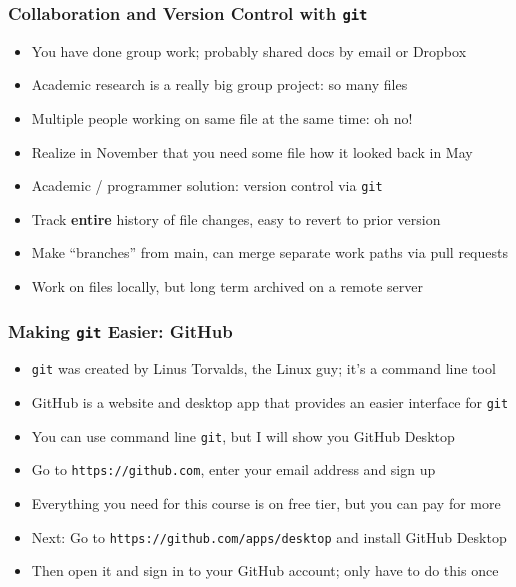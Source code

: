 \documentclass[aspectratio=169]{beamer}
\begin{document}
\begin{frame}
\frametitle{Collaboration and Version Control with \texttt{git}}
\begin{itemize}
	\item You have done group work; probably shared docs by email or Dropbox
	
	\item Academic research is a really big group project: so many files
	
	\item <2->Multiple people working on same file at the same time: oh no!
	
	\item <2->Realize in November that you need some file how it looked back in May
	
	\item <3->Academic / programmer solution: version control via \texttt{git}
	
	\item <3->Track \textbf{entire} history of file changes, easy to revert to prior version
	
	\item <4->Make ``branches'' from main, can merge separate work paths via pull requests
	
	\item <4->Work on files locally, but long term archived on a remote server
\end{itemize}
\end{frame}


\begin{frame}
\frametitle{Making \texttt{git} Easier: GitHub}
\begin{itemize}
	\item \texttt{git} was created by Linus Torvalds, the Linux guy; it's a command line tool
	
	\item GitHub is a website and desktop app that provides an easier interface for \texttt{git}
	
	\item You can use command line \texttt{git}, but I will show you GitHub Desktop
	
	\item <2->Go to \texttt{https://github.com}, enter your email address and sign up
	
	\item <2->Everything you need for this course is on free tier, but you can pay for more
	
	\item <3->Next: Go to \texttt{https://github.com/apps/desktop} and install GitHub Desktop
	
	\item <3->Then open it and sign in to your GitHub account; only have to do this once
\end{itemize}
\end{frame}
\end{document}
